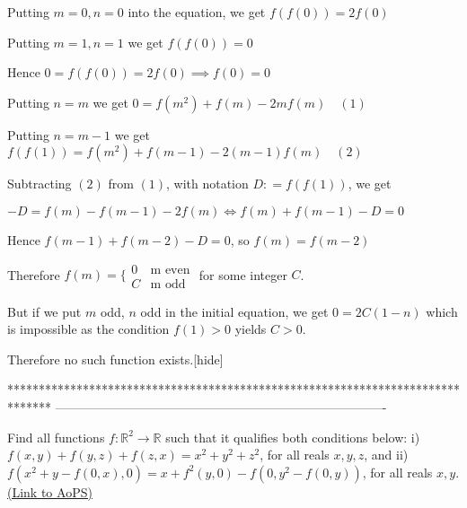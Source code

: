 \begin{solution}Putting $ m = 0, n = 0$ into the equation, we get $ f(f(0)) = 2f(0)$

Putting $ m = 1, n = 1$ we get $ f(f(0)) = 0$

Hence $ 0 = f(f(0)) = 2f(0)\implies f(0) = 0$

Putting $ n = m$ we get $ 0 = f(m^2) + f(m) - 2mf(m)\quad (1)$

Putting $ n = m - 1$ we get $ f(f(1)) = f(m^2) + f(m - 1) - 2(m - 1)f(m)\quad(2)$

Subtracting $ (2)$ from $ (1)$, with notation $ D: = f(f(1))$, we get

$ - D = f(m) - f(m - 1) - 2f(m)\iff f(m) + f(m - 1) - D = 0$

Hence $ f(m - 1) + f(m - 2) - D = 0$, so $ f(m) = f(m - 2)$

Therefore $ f(m) = \{\begin{matrix}0 & \mathrm{m\,\, even} \\
C & \mathrm{m\,\, odd}\end{matrix}$ for some integer $ C$.

But if we put $ m$ odd, $ n$ odd in the initial equation, we get $ 0 = 2C(1 - n)$ which is impossible as the condition $ f(1) > 0$ yields $ C>0$.

Therefore no such function exists.[\/hide]
\end{solution}
*******************************************************************************
-------------------------------------------------------------------------------

\begin{problem}
	Find all functions $ f: \mathbb R^2 \to \mathbb R$ such that it qualifies both conditions below:
i)  $ f(x,y)+f(y,z)+f(z,x)=x^2+y^2+z^2$, for all reals $ x,y,z$, and
ii) $ f(x^2+y-f(0,x),0)=x+f^2(y,0)-f(0,y^2-f(0,y))$, for all reals $ x,y$.
	\flushright \href{https://artofproblemsolving.com/community/c6h272732}{(Link to AoPS)}
\end{problem}



